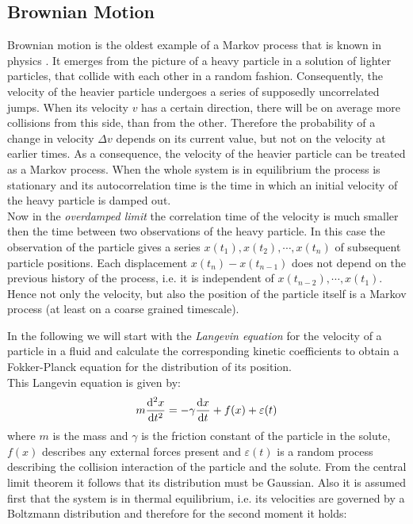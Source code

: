 \subsection{Brownian Motion}
\label{Brownian_Motion}
Brownian motion is the oldest example of a Markov process that is known in physics \cite{Einstein1905,Smoluchowski1906}. It emerges from the picture of a heavy particle in a solution of lighter particles, that collide with each other in a random fashion. Consequently, the velocity of the heavier particle undergoes a series of supposedly uncorrelated jumps. When its velocity $v$ has a certain direction, there will be on average more collisions from this side, than from the other. Therefore the probability of a change in velocity $\Delta v$ depends on its current value, but not on the velocity at earlier times. As a consequence, the velocity of the heavier particle can be treated as a Markov process. When the whole system is in equilibrium the process is stationary and its autocorrelation time is the time in which an initial velocity of the heavy particle is damped out. \\
Now in the \textit{overdamped limit} the correlation time of the velocity is much smaller then the time between two observations of the heavy particle. In this case the observation of the particle gives a series $x(t_1), x(t_2), \cdots , x(t_n)$ of subsequent particle positions. Each displacement $x(t_{n}) - x(t_{n-1})$ does not depend on the previous history of the process, i.e. it is independent of $x(t_{n-2}), \cdots , x(t_{1})$. Hence not only the velocity, but also the position of the particle itself is a Markov process (at least on a coarse grained timescale). 
\par
In the following we will start with the \emph{Langevin equation} \cite{Langevin1908} for the velocity of a particle in a fluid and calculate the corresponding kinetic coefficients to obtain a Fokker-Planck equation for the distribution of its position.\\ 
This Langevin equation is given by:
\begin{equation}
    m \frac{{\rm d}^2 x}{{\rm d}t^2} = -\gamma \frac{ {\rm d}x}{{\rm d}t} + f(x) + \varepsilon(t)
    \label{Langewin equation}
\end{equation}
where $m$ is the mass and $\gamma$ is the friction constant of the particle in the solute, $f(x)$ describes any external forces present and $\varepsilon(t)$ is a random process describing the collision interaction of the particle and the solute. From the central limit theorem it follows that its distribution must be Gaussian. Also it is assumed first that the system is in thermal equilibrium, i.e. its velocities are governed by a Boltzmann distribution and therefore for the second moment it holds:
